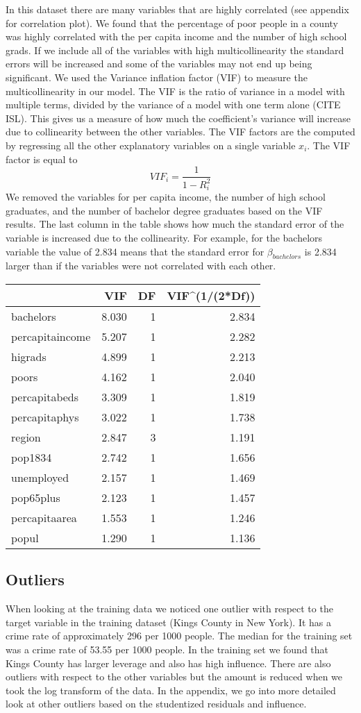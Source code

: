 \documentclass[]{article}
\begin{document}
In this dataset there are many variables that are highly correlated (see
appendix for correlation plot). We found that the percentage of poor
people in a county was highly correlated with the per capita income and
the number of high school grads. If we include all of the variables with
high multicollinearity the standard errors will be increased and some of
the variables may not end up being significant. We used the Variance
inflation factor (VIF) to measure the multicollinearity in our model.
The VIF is the ratio of variance in a model with multiple terms, divided
by the variance of a model with one term alone (CITE ISL). This gives us
a measure of how much the coefficient's variance will increase due to
collinearity between the other variables. The VIF factors are the
computed by regressing all the other explanatory variables on a single
variable \(x_i\). The VIF factor is equal to \[
VIF_i = \frac{1}{1 - R_i^2}
\] We removed the variables for per capita income, the number of high
school graduates, and the number of bachelor degree graduates based on
the VIF results. The last column in the table shows how much the
standard error of the variable is increased due to the collinearity. For
example, for the bachelors variable the value of 2.834 means that the
standard error for \(\beta_{bachelors}\) is 2.834 larger than if the
variables were not correlated with each other.

\begin{longtable}[]{@{}lrrr@{}}
\toprule
& VIF & DF & VIF\^{}(1/(2*Df))\tabularnewline
\midrule
\endhead
bachelors & 8.030 & 1 & 2.834\tabularnewline
percapitaincome & 5.207 & 1 & 2.282\tabularnewline
higrads & 4.899 & 1 & 2.213\tabularnewline
poors & 4.162 & 1 & 2.040\tabularnewline
percapitabeds & 3.309 & 1 & 1.819\tabularnewline
percapitaphys & 3.022 & 1 & 1.738\tabularnewline
region & 2.847 & 3 & 1.191\tabularnewline
pop1834 & 2.742 & 1 & 1.656\tabularnewline
unemployed & 2.157 & 1 & 1.469\tabularnewline
pop65plus & 2.123 & 1 & 1.457\tabularnewline
percapitaarea & 1.553 & 1 & 1.246\tabularnewline
popul & 1.290 & 1 & 1.136\tabularnewline
\bottomrule
\end{longtable}

\subsection{Outliers}\label{outliers}

When looking at the training data we noticed one outlier with respect to
the target variable in the training dataset (Kings County in New York).
It has a crime rate of approximately 296 per 1000 people. The median for
the training set was a crime rate of 53.55 per 1000 people. In the
training set we found that Kings County has larger leverage and also has
high influence. There are also outliers with respect to the other
variables but the amount is reduced when we took the log transform of
the data. In the appendix, we go into more detailed look at other
outliers based on the studentized residuals and influence.
\end{document}
